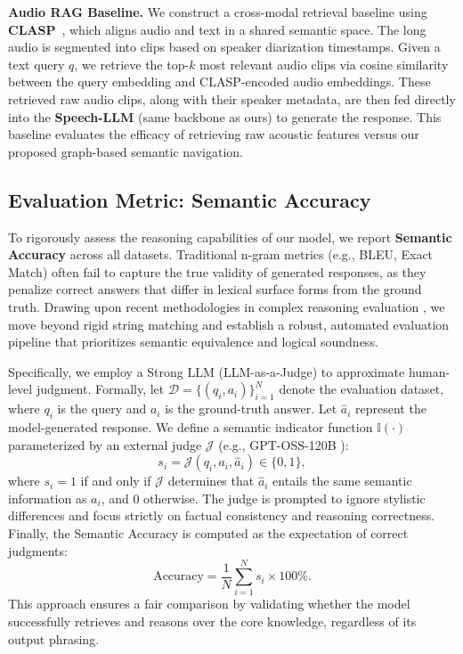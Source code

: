 \documentclass[11pt]{article}
\begin{document}
\textbf{Audio RAG Baseline.}
We construct a cross-modal retrieval baseline using \textbf{CLASP}~\cite{CLASP}, which aligns audio and text in a shared semantic space. 
The long audio is segmented into clips based on speaker diarization timestamps. 
Given a text query $q$, we retrieve the top-$k$ most relevant audio clips via cosine similarity between the query embedding and CLASP-encoded audio embeddings. 
These retrieved raw audio clips, along with their speaker metadata, are then fed directly into the \textbf{Speech-LLM} (same backbone as ours) to generate the response. 
This baseline evaluates the efficacy of retrieving raw acoustic features versus our proposed graph-based semantic navigation.


\subsection{Evaluation Metric: Semantic Accuracy}

To rigorously assess the reasoning capabilities of our model, we report \textbf{Semantic Accuracy} across all datasets. 
Traditional n-gram metrics (e.g., BLEU, Exact Match) often fail to capture the true validity of generated responses, as they penalize correct answers that differ in lexical surface forms from the ground truth. 
Drawing upon recent methodologies in complex reasoning evaluation \cite{mishra-etal-2025-investigating, shui-etal-2023-comprehensive}, we move beyond rigid string matching and establish a robust, automated evaluation pipeline that prioritizes semantic equivalence and logical soundness.

Specifically, we employ a Strong LLM (LLM-as-a-Judge) to approximate human-level judgment. 
Formally, let $\mathcal{D} = \{(q_i, a_i)\}_{i=1}^{N}$ denote the evaluation dataset, where $q_i$ is the query and $a_i$ is the ground-truth answer. Let $\hat{a}_i$ represent the model-generated response. 
We define a semantic indicator function $\mathbb{I}(\cdot)$ parameterized by an external judge $\mathcal{J}$ (e.g., GPT-OSS-120B \cite{openai2025gptoss120bgptoss20bmodel}):
\begin{equation}
    s_i = \mathcal{J}(q_i, a_i, \hat{a}_i) \in \{0, 1\},
\end{equation}
where $s_i = 1$ if and only if $\mathcal{J}$ determines that $\hat{a}_i$ entails the same semantic information as $a_i$, and $0$ otherwise. 
The judge is prompted to ignore stylistic differences and focus strictly on factual consistency and reasoning correctness. 
Finally, the Semantic Accuracy is computed as the expectation of correct judgments:
\begin{equation}
    \text{Accuracy} = \frac{1}{N} \sum_{i=1}^{N} s_i \times 100\%.
\end{equation}
This approach ensures a fair comparison by validating whether the model successfully retrieves and reasons over the core knowledge, regardless of its output phrasing.
\end{document}
